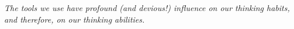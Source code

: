 \subsection{}
{

\begin{frame}{}
 
\LARGE 
\textit{ 
The tools we use have profound (and devious!) influence on our 
thinking habits, and therefore, on our thinking abilities.}

\end{frame}
}




